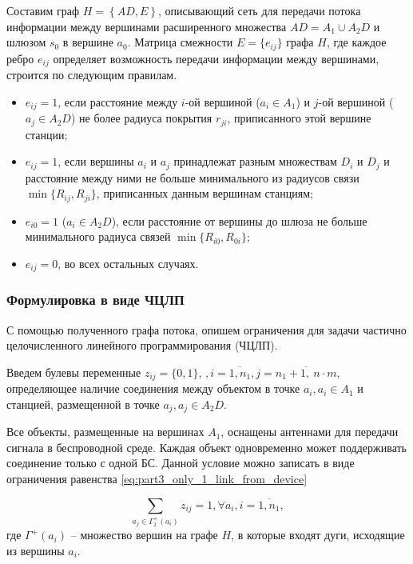Составим граф $H=\left\{AD,E\right\}$, описывающий сеть для передачи потока информации между вершинами расширенного множества $AD=A_1 \cup A_2D$ и шлюзом $s_0$ в вершине $a_0$.
Матрица смежности $E = \{e_{ij} \}$ графа $H$, где каждое ребро $e_{ij}$ определяет возможность передачи информации между вершинами, строится по следующим правилам. 

\begin{itemize}
    \item $e_{ij} = 1$, если расстояние между $i$-ой вершиной ($a_i \in A_1$) и $j$-ой вершиной ($a_j \in A_2D$) не более радиуса покрытия $r_{ji}$, приписанного этой вершине станции;
    \item $e_{ij} = 1$, если вершины $a_i$ и $a_j$ принадлежат разным множествам $D_i$ и $D_j$ и расстояние между ними не больше минимального из радиусов связи $\min\{R_{ij}, R_{ji}\}$, приписанных данным вершинам станциям;
    \item $e_{i0} = 1$ ($a_i \in A_2D$), если расстояние от вершины до шлюза не больше минимального радиуса связей $\min\{R_{i0}, R_{0i}\}$;
    \item $e_{ij} = 0$, во всех остальных случаях.
\end{itemize}

\subsubsection{Формулировка в виде ЧЦЛП}

С помощью полученного графа потока, опишем ограничения для задачи частично целочисленного линейного программирования (ЧЦЛП).

Введем булевы переменные $z_{ij} = \{0, 1\}$, $, i = \overline{1,n_1}, j = \overline{n_1+1, \ n \cdot m}$, определяющее наличие соединения между объектом в точке $a_i, a_i \in A_1$  и станцией, размещенной в точке $a_j, a_j \in A_2D$.


Все объекты, размещенные на вершинах $A_1$, оснащены антеннами для передачи сигнала в беспроводной среде. Каждая объект одновременно может поддерживать соединение только с одной БС. Данной условие можно записать в виде ограничения равенства \cref{eq:part3_only_1_link_from_device}


\begin{equation}\label{eq:part3_only_1_link_from_device}
    \sum_{a_j \in \Gamma_2^+(a_i)} z_{ij} = 1, \forall a_i, i =\overline{1, n_1},
\end{equation} 
где $\Gamma^+(a_i)$ -- множество вершин на графе $H$, в которые входят дуги, исходящие из вершины $a_i$.

